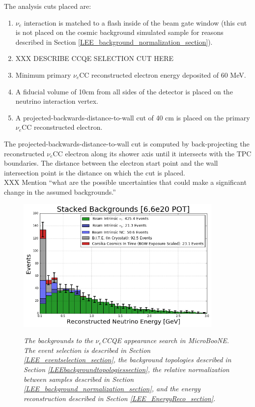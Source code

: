 The analysis cuts placed are:
\begin{enumerate}
\item $\nu_e$ interaction is matched to a flash inside of the beam gate window (this cut is not placed on the cosmic background simulated sample for reasons described in Section \ref{LEE_background_normalization_section}).
\item XXX DESCRIBE CCQE SELECTION CUT HERE
\item Minimum primary $\nu_e$CC reconstructed electron energy deposited of 60 MeV.
\item A fiducial volume of 10cm from all sides of the detector is placed on the neutrino interaction vertex.
\item A projected-backwards-distance-to-wall cut of 40 cm is placed on the primary $\nu_e$CC reconstructed electron.
\end{enumerate}
The projected-backwards-distance-to-wall cut is computed by back-projecting the reconstructed $\nu_e$CC electron along its shower axis until it intersects with the TPC boundaries. The distance between the electron start point and the wall intersection point is the distance on which the cut is placed.\\

XXX  Mention ``what are the possible uncertainties that could make a significant change in the assumed backgrounds.''

\begin{figure}[ht!]
\centering
\includegraphics[width=0.9\textwidth]{Figures/LEE_stackedbackgrounds_nosignal_withAnalysisCuts.png}\\
\caption{\textit{The backgrounds to the $\nu_e$CCQE appearance search in MicroBooNE. The event selection is described in Section \ref{LEE_eventselection_section}, the background topologies described in Section \ref{LEEbackgroundtopologiessection}, the relative normalization between samples described in Section \ref{LEE_background_normalization_section}, and the energy reconstruction described in Section \ref{LEE_EnergyReco_section}.}}
\label{energy_res_plot_fig}
\end{figure}





